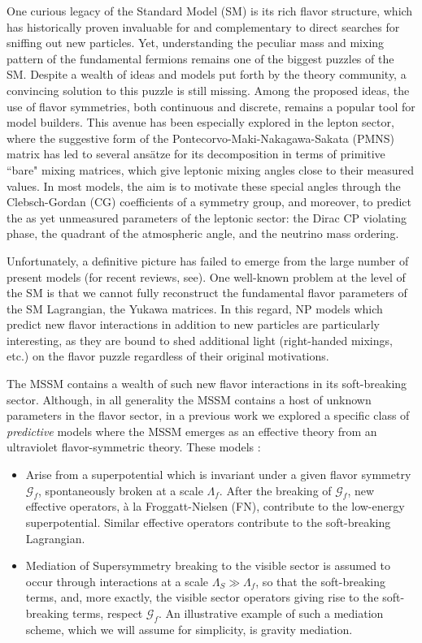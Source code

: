 \documentclass[a4paper,11pt]{article}
\begin{document}
One curious legacy of the Standard Model (SM) is its rich flavor structure, which has historically \cite{Glashow:1970gm} proven invaluable for and complementary to direct searches for sniffing out new particles. Yet, understanding the peculiar mass and mixing pattern of the fundamental fermions remains one of the biggest puzzles of the SM. Despite a wealth of ideas and models put forth by the theory community, a convincing solution to this puzzle is still missing. Among the proposed ideas, the use of flavor symmetries, both continuous and discrete, remains a popular tool for model builders. This avenue has been especially explored in the lepton sector, where the suggestive form of the Pontecorvo-Maki-Nakagawa-Sakata (PMNS) matrix has led to several ans{\"a}tze for its decomposition in terms of primitive ``bare" mixing matrices, which give leptonic mixing angles close to their measured values. In most models, the aim is to motivate these special angles through the Clebsch-Gordan (CG) coefficients of a symmetry group, and moreover, to predict the as yet unmeasured parameters of the leptonic sector: the Dirac CP violating phase, the quadrant of the atmospheric angle, and the neutrino mass ordering. 

Unfortunately, a definitive picture has failed to emerge from the large number of present models (for recent reviews, see\cite{Babu:2009fd,Altarelli:2010gt}). One well-known problem at the level of the SM is that we cannot fully reconstruct the fundamental flavor parameters of the SM Lagrangian, the Yukawa matrices. In this regard, NP models which predict new flavor interactions in addition to new particles are particularly interesting, as they are bound to shed additional light (right-handed mixings, etc.) on the flavor puzzle regardless of their original motivations.  
  
The MSSM contains a wealth of such new flavor interactions in its soft-breaking sector. Although, in all generality the MSSM contains a host of unknown parameters in the flavor sector, in a previous work \cite{Das:2016czs} we explored a specific class of \emph{predictive} models where the MSSM emerges as an effective theory from an ultraviolet flavor-symmetric theory. These models :

\begin{itemize}

\item Arise from a superpotential which is invariant under a given flavor symmetry $\mathcal{G}_f$, spontaneously broken at a scale $\Lambda_f$. After the breaking of $\mathcal{G}_f$, new effective operators, \`a la Froggatt-Nielsen (FN), contribute to the low-energy superpotential. Similar effective operators contribute to the soft-breaking Lagrangian. 

\item Mediation of Supersymmetry breaking to the visible sector is assumed to occur through interactions at a scale $\Lambda_S  \gg \Lambda_f$, so that the soft-breaking terms, and, more exactly, the visible sector operators giving rise to the soft-breaking terms, respect $\mathcal{G}_f$. An illustrative example of such a mediation scheme, which we will assume for simplicity, is gravity mediation.
\end{itemize} 
\end{document}
